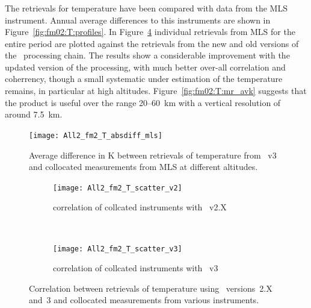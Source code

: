 
\subsubsection{}
\label{sec:fm02:comparison:temperature}
The retrievals for temperature have been compared with data from the MLS
instrument. Annual average differences to this instruments are shown in
Figure~\ref{fig:fm02:T:profiles}. In Figure~\ref{fig:fm02:T:scatter} individual
retrievals from MLS for the entire period are plotted against the
retrievals from the new and old versions of the \smr\ processing chain. The
results show a considerable improvement with the updated version of the
processing, with much better over-all correlation and coherrency, though a
small systematic under estimation of the temperature remains, in particular at
high altitudes.
Figure~\ref{fig:fm02:T:mr_avk} suggests that the product is useful over the
range 20--60~km with a vertical resolution of around 7.5~km.

\begin{figure}[tbhp]
    \centering
    \texttt{[image: All2\_fm2\_T\_absdiff\_mls]}
    \caption{Average difference in K between retrievals of temperature from
    \smr~v3 and collocated measurements from MLS at different altitudes.}
    \label{fig:fm02:T:profiles}
    \label{fig:fm02:T:profiles:MLS}
\end{figure}

\begin{figure}[tbhp]
    \centering
    \begin{subfigure}[b]{0.49\textwidth}
        \texttt{[image: All2\_fm2\_T\_scatter\_v2]}
        \caption{correlation of collcated instruments with \smr~v2.X}
        \label{fig:fm02:T:scatter:v2}
    \end{subfigure}
    \,
    \begin{subfigure}[b]{0.49\textwidth}
        \texttt{[image: All2\_fm2\_T\_scatter\_v3]}
        \caption{correlation of collcated instruments with \smr~v3}
        \label{fig:fm02:T:scatter:v3}
    \end{subfigure}
    \caption{Correlation between retrievals of temperature using \smr\
    versions~2.X and~3 and collocated measurements from various instruments.}
    \label{fig:fm02:T:scatter}
\end{figure}


